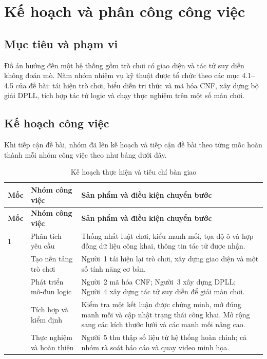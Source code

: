 \chapter{Kế hoạch và phân công công việc}
\label{chap:planning}

\section{Mục tiêu và phạm vi}
Đồ án hướng đến một hệ thống gồm trò chơi có giao diện và tác tử suy diễn không đoán mò. Năm nhóm nhiệm vụ kỹ thuật được tổ chức theo các mục 4.1--4.5 của đề bài: tái hiện trò chơi, biểu diễn tri thức và mã hóa CNF, xây dựng bộ giải DPLL, tích hợp tác tử logic và chạy thực nghiệm trên một số màn chơi.


\section{Kế hoạch công việc}

Khi tiếp cận đề bài, nhóm đã lên kế hoạch và tiếp cận đề bài theo từng mốc hoàn thành mỗi nhóm công việc theo như bảng dưới đây. 

\begingroup
\small\linespread{1.15}\selectfont
\begin{longtable}{@{}p{}p{}p{}@{}}
\caption{Kế hoạch thực hiện và tiêu chí bàn giao}\label{tab:plan}\\
\toprule
\textbf{Mốc} & \textbf{Nhóm công việc} & \textbf{Sản phẩm và điều kiện chuyển bước} \\
\midrule
\endfirsthead
\toprule
\textbf{Mốc} & \textbf{Nhóm công việc} & \textbf{Sản phẩm và điều kiện chuyển bước} \\
\midrule
\endhead
1 & Phân tích yêu cầu & Thống nhất luật chơi, kiểu manh mối, tọa độ ô và hợp đồng dữ liệu công khai, thông tin tác tử được nhận. \\
\addlinespace
2 & Tạo nền tảng trò chơi & Người~1 tái hiện lại trò chơi, xây dựng giao diện và một số tính năng cơ bản. \\
\addlinespace
3 & Phát triển mô-đun logic & Người~2 mã hóa CNF; Người~3 xây dựng DPLL; Người~4 xây dựng tác tử suy diễn để giải màn chơi. \\
\addlinespace
4 & Tích hợp và kiểm định & Kiểm tra một kết luận được chứng minh, mở đúng manh mối và cập nhật trạng thái công khai. Mở rộng sang các kích thước lưới và các manh mối nâng cao. \\
\addlinespace
5 & Thực nghiệm và hoàn thiện & Người~5 thu thập số liệu từ hệ thống hoàn chỉnh; cả nhóm rà soát báo cáo và quay video minh họa. \\
\bottomrule
\end{longtable}
\endgroup

